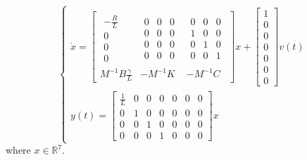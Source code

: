 \begin{equation}
\begin{cases}
\dot{x}=
\left[ \begin{array} { c|c|c  } 
                \begin{array}{c} 
               -\frac{R}{L} \\ 
                0 \\
                0 \\
                0
                \end{array} &
                \begin{array}{ccc} 
               0 & 0 & 0\\ 
                0 & 0  &0 \\
                0  & 0  & 0\\
                0 & 0 &0
                \end{array}&
                \begin{array}{ccc} 
               0 & 0 &0\\ 
                1 & 0 &0 \\
                0  & 1  &0 \\
                0 & 0 & 1
                \end{array} \\
                \hline 
                M^{-1}B\frac{\gamma} {L}& -M^{-1}K & -M^{-1}C
\end{array} \right] 
x+\begin{bmatrix}1 \\ 0 \\ 0 \\ 0 \\ 0\\0 \\0 \end{bmatrix}v(t)\\
y(t) = \begin{bmatrix} \frac{1}{L} & 0 & 0 & 0 & 0 & 0 &0\\
0 & 1 & 0 & 0 & 0 & 0 &0 \\
0 & 0 & 1 & 0 & 0 &0  &0 \\
0 & 0 & 0 & 1 & 0 & 0 &0 \end{bmatrix}x
\end{cases}
\end{equation}
where $x \in \mathbb{R}^7$.
